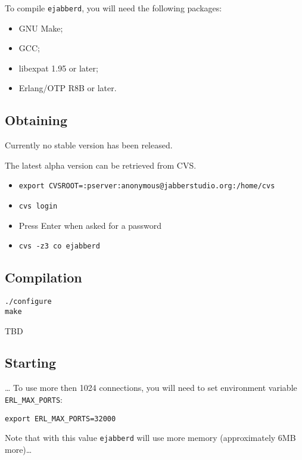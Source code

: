 \documentclass[10pt]{article}
\newcommand{\ejabberd}{\texttt{ejabberd}}
\begin{document}
To compile \ejabberd{}, you will need the following packages:
\begin{itemize}
\item GNU Make;
\item GCC;
\item libexpat 1.95 or later;
\item Erlang/OTP R8B or later.
\end{itemize}

\subsection{Obtaining}
\label{sec:obtaining}

Currently no stable version has been released.

The latest alpha version can be retrieved from CVS\@.
\begin{itemize}
\item \texttt{export CVSROOT=:pserver:anonymous@jabberstudio.org:/home/cvs}
\item \texttt{cvs login}
\item Press Enter when asked for a password
\item \texttt{cvs -z3 co ejabberd}
\end{itemize}






\subsection{Compilation}
\label{sec:compilation}

\begin{verbatim}
./configure
make
\end{verbatim}

TBD





\subsection{Starting}
\label{sec:starting}

\ldots{} To use more then 1024 connections, you will need to set environment
variable \texttt{ERL\_MAX\_PORTS}:
\begin{verbatim}
export ERL_MAX_PORTS=32000
\end{verbatim}
Note that with this value \ejabberd{} will use more memory (approximately 6MB
more)\ldots{}
\end{document}
